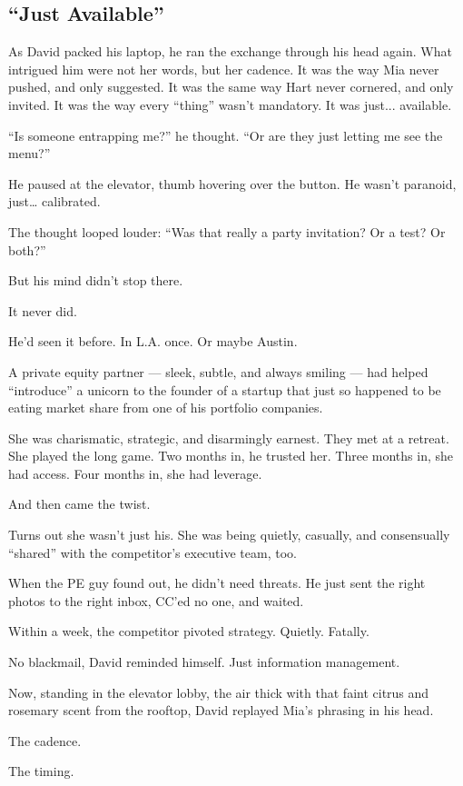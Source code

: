 \subsection{``Just Available''}

As David packed his laptop, he ran the exchange through his head again. What intrigued him were not her words, 
but her cadence. It was the way Mia never pushed, and only suggested. It was the same way Hart never cornered, and only 
invited. It was the way every ``thing'' wasn’t mandatory. It was just... available.

``Is someone entrapping me?'' he thought. ``Or are they just letting me see the menu?''

He paused at the elevator, thumb hovering over the button. He wasn’t paranoid, just… calibrated.

The thought looped louder: ``Was that really a party invitation? Or a test? Or both?''

But his mind didn’t stop there.

It never did.

He’d seen it before. In L.A. once. Or maybe Austin.

A private equity partner --- sleek, subtle, and always smiling --- had helped ``introduce'' 
a unicorn to 
the founder of a startup that just so happened to be eating market share from one of his 
portfolio companies.

She was charismatic, strategic, and disarmingly earnest. They met at a retreat. She played the 
long game. Two months in, he trusted her. Three months in, she had access. Four months in, she 
had leverage.

And then came the twist.

Turns out she wasn’t just his. She was being quietly, casually, and consensually
``shared'' with the competitor’s executive team, 
too. 

When the PE guy found out, he didn’t need threats. He just sent the right photos to the right 
inbox, CC’ed no one, and waited.

Within a week, the competitor pivoted strategy. Quietly. Fatally.

No blackmail, David reminded himself. Just information management.

Now, standing in the elevator lobby, the air thick with that faint citrus and rosemary scent 
from the rooftop, David replayed Mia’s phrasing in his head.

The cadence.

The timing.

